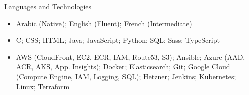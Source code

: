 \documentclass[]{mcdowellcv}
\begin{document}
	\begin{cvsection}{Languages and Technologies}
		\begin{cvsubsection}{}{}{}	
			\begin{itemize}
				\item Arabic (Native); English (Fluent); French (Intermediate)
				\item C; CSS; HTML; Java; JavaScript; Python; SQL; Sass; TypeScript
				\item AWS (CloudFront, EC2, ECR, IAM, Route53, S3); Ansible; Azure (AAD, ACR, AKS, App. Insights); Docker; Elasticsearch; Git; Google Cloud (Compute Engine, IAM, Logging, SQL); Hetzner; Jenkins; Kubernetes; Linux; Terraform
			\end{itemize}
		\end{cvsubsection}
	\end{cvsection}
	
\end{document}
